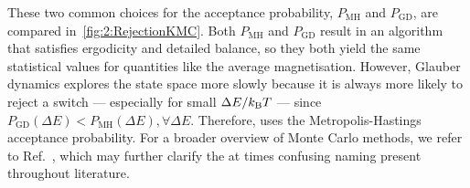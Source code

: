 
These two common choices for the acceptance probability, $P_\mathrm{MH}$ and $P_\mathrm{GD}$, are compared in~\cref{fig:2:RejectionKMC}.
Both $P_\mathrm{MH}$ and $P_\mathrm{GD}$ result in an algorithm that satisfies ergodicity and detailed balance, so they both yield the same statistical values for quantities like the average magnetisation.
However, Glauber dynamics explores the state space more slowly because it is always more likely to reject a switch --- especially for small $\Delta E / \kBT$ --- since $P_\mathrm{GD}(\Delta E) < P_\mathrm{MH}(\Delta E), \forall \Delta E$.
Therefore, \hotspice uses the Metropolis-Hastings acceptance probability.
For a broader overview of Monte Carlo methods, we refer to Ref.~\cite{IntroductionMC}, which may further clarify the at times confusing naming present throughout literature.

\newpage
